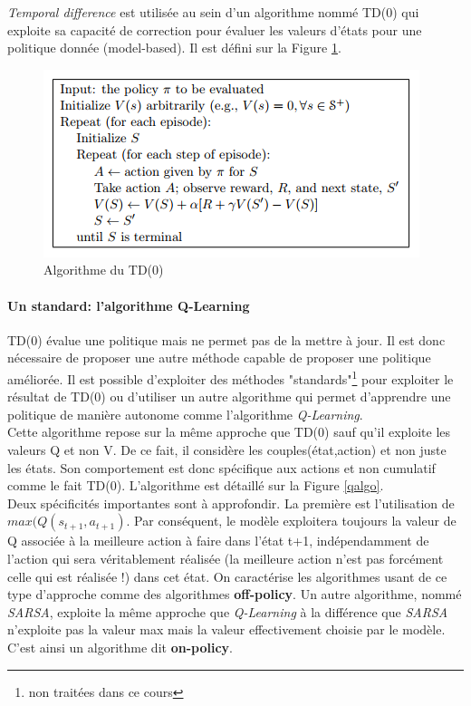 \noindent \textit{Temporal difference} est utilisée au sein d'un algorithme nommé TD(0) qui exploite sa capacité de correction pour évaluer les valeurs d'états pour une politique donnée (model-based). Il est défini sur la Figure \ref{tdalgo}.

\begin{figure}
    \centering
    \includegraphics[scale=0.4]{./tex/reinforcement-learning/tdalgo.png}
    \caption{Algorithme du TD(0)}
    \label{tdalgo}
\end{figure}

\paragraph{Un standard: l'algorithme Q-Learning}
TD(0) évalue une politique mais ne permet pas de la mettre à jour. Il est donc nécessaire de proposer une autre méthode capable de proposer une politique améliorée. Il est possible d'exploiter des méthodes "standards"\footnote{non traitées dans ce cours} pour exploiter le résultat de TD(0) ou d'utiliser un autre algorithme qui permet d'apprendre une politique de manière autonome comme l'algorithme \textit{Q-Learning}.\\

\noindent Cette algorithme repose sur la même approche que TD(0) sauf qu'il exploite les valeurs Q et non V. De ce fait, il considère les couples(état,action) et non juste les états. Son comportement est donc spécifique aux actions et non cumulatif comme le fait TD(0). L'algorithme est détaillé sur la Figure \ref{qalgo}.\\

\noindent Deux spécificités importantes sont à approfondir. La première est l'utilisation de $max(Q(s_{t+1},a_{t+1})$. Par conséquent, le modèle exploitera toujours la valeur de Q associée à la meilleure action à faire dans l'état t+1, indépendamment de l'action qui sera véritablement réalisée (la meilleure action n'est pas forcément celle qui est réalisée !) dans cet état. On caractérise les algorithmes usant de ce type d'approche comme  des algorithmes \textbf{off-policy}. Un autre algorithme, nommé \textit{SARSA}\cite{sarsa}, exploite la même approche que \textit{Q-Learning} à la différence que \textit{SARSA} n'exploite pas la valeur max mais la valeur effectivement choisie par le modèle. C'est ainsi un algorithme dit \textbf{on-policy}.\\

